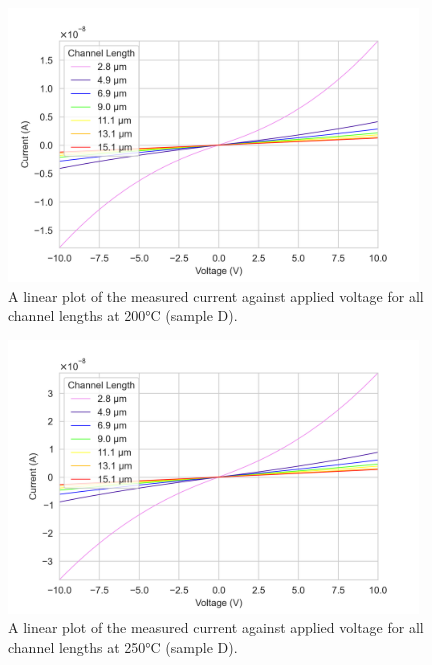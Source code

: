 \begin{figure}[h]
    \centering
    \includegraphics[width=0.97\textwidth]{Chapter6/Figs/Raster/Sample D 2019/IV/10V IV characteristics at 200 C.png}
    \caption{A linear plot of the measured current against applied voltage for all channel lengths at 200\si{\degreeCelsius} (sample D).}
    \label{appfig:D_current_voltage_200_10V}
\end{figure}
\begin{figure}[h]
    \centering
    \includegraphics[width=0.97\textwidth]{Chapter6/Figs/Raster/Sample D 2019/IV/10V IV characteristics at 250 C.png}
    \caption{A linear plot of the measured current against applied voltage for all channel lengths at 250\si{\degreeCelsius} (sample D).}
    \label{appfig:D_current_voltage_250_10V}
\end{figure}
